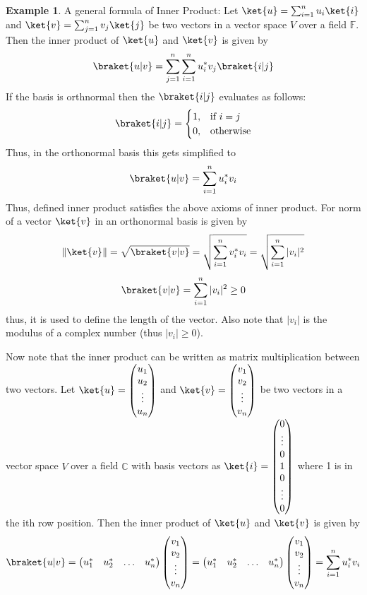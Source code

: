 \documentclass[12pt, oneside]{book}
\theoremstyle{definition}
\theoremstyle{definition}
\newtheorem{example}{Example}[section]
\theoremstyle{remark}
\begin{document}
\begin{example}
    A general formula of Inner Product: Let $\ket{u}=\sum_{i=1}^{n}u_i\ket{i}$ and $\ket{v}=\sum_{j=1}^{n}v_j\ket{j}$ be two vectors in a vector space $V$ over a field $\mathbb{F}$. Then the inner product of $\ket{u}$ and $\ket{v}$ is given by
    \[
        \braket{u|v}=\sum_{j=1}^{n} \sum_{i=1}^{n}u_i^*v_j \braket{i|j}
    \]
    If the basis is orthnormal then the $\braket{i|j}$ evaluates as follows:
    \[
    \braket{i|j}= 
\begin{cases}
    1, & \text{if } i=j\\
    0, & \text{otherwise}
\end{cases}
\]
Thus, in the orthonormal basis this gets simplified to 
\[ \braket{u|v}=\sum_{i=1}^{n}u_i^*v_i \]
Thus, defined inner product satisfies the above axioms of inner product.
For norm of a vector $\ket{v}$ in an orthonormal basis is given by
\[
    \|\ket{v}\|=\sqrt{\braket{v|v}}=\sqrt{\sum_{i=1}^{n}v_i^*v_i}=\sqrt{\sum_{i=1}^{n}|v_i|^2}
\]
\[ \braket{v|v}=\sum_{i=1}^{n}|v_i|^2 \geq 0 \]
thus, it is used to define the length of the vector. Also note that $|v_i|$ is the modulus of a complex number (thus $|v_i| \geq 0$).
\end{example}
Now note that the inner product can be written as matrix multiplication between two vectors. Let $\ket{u}=\begin{pmatrix} u_1 \\ u_2 \\ \vdots \\ u_n \end{pmatrix}$ 
and $\ket{v}=\begin{pmatrix} v_1 \\ v_2 \\ \vdots \\ v_n \end{pmatrix}$ be two vectors in a 
vector space $V$ over a field $\mathbb{C}$ with basis vectors as $\ket{i}=\begin{pmatrix} 0 \\ \vdots \\ 0 \\ 1 \\ 0 \\ \vdots \\ 0 \end{pmatrix}$ where 1 is in the ith row position. Then the inner product of $\ket{u}$ and $\ket{v}$ is given by
\[
    \braket{u|v}=\begin{pmatrix} u_1^* & u_2^* & \ldots & u_n^* \end{pmatrix} \begin{pmatrix} v_1 \\ v_2 \\ \vdots \\ v_n \end{pmatrix}=\begin{pmatrix} u_1^* & u_2^* & \ldots & u_n^* \end{pmatrix} \begin{pmatrix} v_1 \\ v_2 \\ \vdots \\ v_n \end{pmatrix}=\sum_{i=1}^{n}u_i^*v_i
\]
\end{document}
